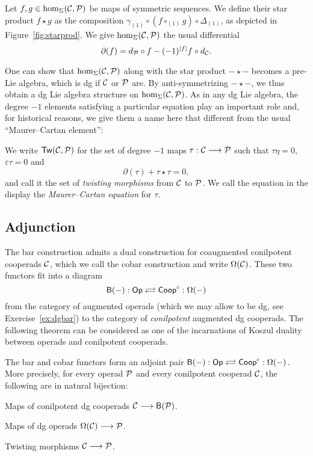 \begin{definition}
Let $f,g\in \hom_\Sigma(\mathcal{C},{\mathcal{P}})$ be maps of symmetric
sequences. We define their star product $f\star g$ 
as the composition
$\gamma_{(1)} \circ (f\circ_{(1)} g)\circ \Delta_{(1)}$,
as depicted in Figure~\ref{fig:starprod}. We give 
$\hom_\Sigma(\mathcal{C},{\mathcal{P}})$ the usual differential
\[
\partial(f) = d_{\mathcal{P}} \circ f  - (-1)^{|f|} f\circ d_{\mathcal{C}}.
\]
\end{definition}

One can show that $\hom_\Sigma(\mathcal{C},{\mathcal{P}})$ along with
the star product $-\star -$ becomes a pre-Lie algebra,
 which is dg if $\mathcal{C}$ or ${\mathcal{P}}$ are. By anti-symmetrizing
 $-\star -$, we thus obtain a dg Lie algebra structure
 on $\hom_\Sigma(\mathcal{C},{\mathcal{P}})$. As in any dg Lie algebra,
 the degree $-1$ elements satisfying a particular equation
 play an important role and, for historical reasons,
  we give them a name here that 
 different from the usual ``Maurer--Cartan element'':
 
\begin{definition}
We write $\mathsf{Tw}(\mathcal{C},{\mathcal{P}})$ for the set of degree $-1$ maps
$\tau : \mathcal{C}\longrightarrow {\mathcal{P}}$
such that $\tau\eta =0$, $\varepsilon\tau = 0$
and 
\[
\partial(\tau) + \tau\star \tau = 0,
\]
and call it the set of \emph{twisting morphisms} from
$\mathcal{C}$ to ${\mathcal{P}}$. We call the equation in the display the
\emph{Maurer--Cartan equation} for $\tau$.
\end{definition}


\subsection{Adjunction}
The bar construction admits a dual construction for
coaugmented conilpotent cooperads $\mathcal{C}$, which we call
the cobar construction and write $\Omega(\mathcal{C})$. These
two functors fit into a diagram
\[
\B{-} : \mathsf{Op} \adjoint
   \mathsf{Coop}^c  : \Omega(-)
\]
from the category of augmented operads (which we may allow to be
dg, see Exercise~\ref{ex:dgbar}) to the category of
\emph{conilpotent} augmented dg cooperads. The following
theorem can be considered as one of the incarnations of Koszul
duality between operads and conilpotent cooperads.

\begin{theorem}\label{thm:adjunction}
The bar and cobar functors form an adjoint pair
$\B{-} : \mathsf{Op} \adjoint \mathsf{Coop}^c  : \Omega(-)$.
More precisely, 
for every operad ${\mathcal{P}}$ and every conilpotent cooperad
$\mathcal{C}$, the following are in natural bijection:
\begin{tenumerate}
\item Maps of conilpotent dg cooperads $\mathcal{C} \longrightarrow \mathsf{B}({\mathcal{P}})$.
\item Maps of dg operads $\Omega(\mathcal{C}) \longrightarrow{\mathcal{P}}$.
\item Twisting morphisms $\mathcal{C} \longrightarrow {\mathcal{P}}$.
\end{tenumerate}
\end{theorem}

